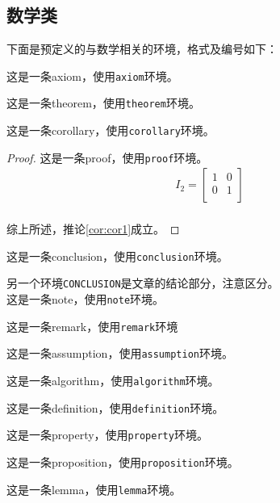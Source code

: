     \subsection{数学类}\label{subsec:math}
        下面是预定义的与数学相关的环境，格式及编号如下：
    \begin{axiom}
        这是一条axiom，使用\texttt{axiom}环境。
    \end{axiom}
    \begin{theorem}[某某定理]
        这是一条theorem，使用\texttt{theorem}环境。
    \end{theorem}
    \begin{corollary}[一条推论]\label{cor:cor1}
        这是一条corollary，使用\texttt{corollary}环境。
    \end{corollary}
    \begin{proof}
        这是一条proof，使用\texttt{proof}环境。
        \begin{align}
            I_2=
            \begin{bmatrix}
                1 & 0 \\ 0 & 1 \\
            \end{bmatrix}
        \end{align}\\
        综上所述，推论\ref{cor:cor1}成立。
    \end{proof}
    \begin{conclusion}
        这是一条conclusion，使用\texttt{conclusion}环境。
    \end{conclusion}
    \begin{note}
        另一个环境\texttt{CONCLUSION}是文章的结论部分，注意区分。\\这是一条note，使用\texttt{note}环境。
    \end{note}
    \begin{remark}
        这是一条remark，使用\texttt{remark}环境
    \end{remark}
    \begin{assumption}
        这是一条assumption，使用\texttt{assumption}环境。
    \end{assumption}
    \begin{algorithm}
        这是一条algorithm，使用\texttt{algorithm}环境。
    \end{algorithm}
    \begin{definition}
        这是一条definition，使用\texttt{definition}环境。
    \end{definition}
    \begin{property}
        这是一条property，使用\texttt{property}环境。
    \end{property}
    \begin{proposition}
        这是一条proposition，使用\texttt{proposition}环境。
    \end{proposition}
    \begin{lemma}
        这是一条lemma，使用\texttt{lemma}环境。
    \end{lemma}
    
